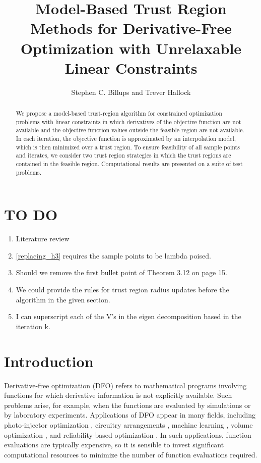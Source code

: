 \documentclass{article}
\title{Model-Based Trust Region Methods for Derivative-Free Optimization with Unrelaxable Linear Constraints}
\author{Stephen C.  Billups and Trever Hallock}
\begin{document}
\maketitle

\begin{abstract}
We propose a model-based trust-region algorithm for constrained optimization problems with linear constraints in which derivatives of the objective function are not available and the objective function values outside the feasible region are not available.
In each iteration, the objective function is approximated by an interpolation model, which is then minimized over a trust region.
To ensure feasibility of all sample points and iterates, we consider two trust region strategies in which the trust regions are contained in the feasible region.
Computational results are presented on a suite of test problems.

\end{abstract}

\newpage

\tableofcontents

\newpage
\section{TO DO}
\begin{enumerate}
\item Literature review
\item \cref{replacing_h3} requires the sample points to be lambda poised.
\item Should we remove the first bullet point of Theorem 3.12 on page 15.
\item We could provide the rules for trust region radius updates before the algorithm in the given section.
\item I can superscript each of the V's in the eigen decomposition based in the iteration k.
\end{enumerate}
\section{Introduction}
Derivative-free optimization (DFO) refers to mathematical programs involving functions for which derivative information is not explicitly available.
Such problems arise, for example, when the functions are evaluated by simulations or by laboratory experiments.
Applications of DFO appear in many fields, including photo-injector optimization \cite{Neveu2017},
circuitry arrangements \cite{PLOSKAS201816}, machine learning \cite{KS2018}, volume optimization \cite{Cheng2017}, and reliability-based optimization \cite{Gao2017}.
In such applications, function evaluations are typically expensive, 
so it is sensible to invest significant computational resources to minimize the number of function evaluations required.
\end{document}
